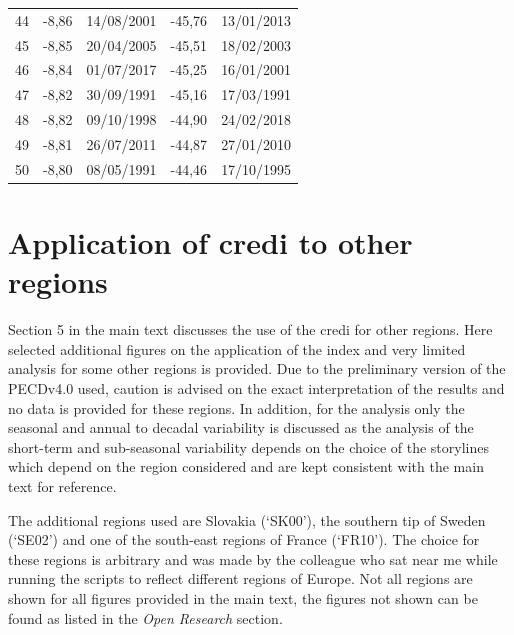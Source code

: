 \documentclass[a4paper,11pt]{extarticle}
\newcommand{\credi}[0]{{\sc credi}}
\begin{document}
\begin{longtable}{|r|rl|rl|}
44        & -8,86           & 14/08/2001     & -45,76          & 13/01/2013     \\
45        & -8,85           & 20/04/2005     & -45,51          & 18/02/2003     \\
46        & -8,84           & 01/07/2017     & -45,25          & 16/01/2001     \\
47        & -8,82           & 30/09/1991     & -45,16          & 17/03/1991     \\
48        & -8,82           & 09/10/1998     & -44,90          & 24/02/2018     \\
49        & -8,81           & 26/07/2011     & -44,87          & 27/01/2010     \\
50        & -8,80           & 08/05/1991     & -44,46          & 17/10/1995     
\end{longtable}  



\section{Application of \credi{} to other regions}\label{app:regions}
Section 5 in the main text discusses the use of the \credi{} for other regions. 
Here selected additional figures on the application of the index and very limited analysis for some other regions is provided.
Due to the preliminary version of the PECDv4.0 used, caution is advised on the exact interpretation of the results and no data is  provided for these regions. 
In addition, for the analysis only the seasonal and annual to decadal variability is discussed as the analysis of the short-term and sub-seasonal variability depends on the choice of the storylines which depend on the region considered and are kept consistent with the main text for reference.

The additional regions used are Slovakia (`SK00'), the southern tip of Sweden (`SE02') and one of the south-east regions of France (`FR10').
The choice for these regions is arbitrary and was made by the colleague who sat near me while running the scripts to reflect different regions of Europe. 
Not all regions are shown for all figures provided in the main text, the figures not shown can be found as listed in the \emph{Open Research} section.
\end{document}
